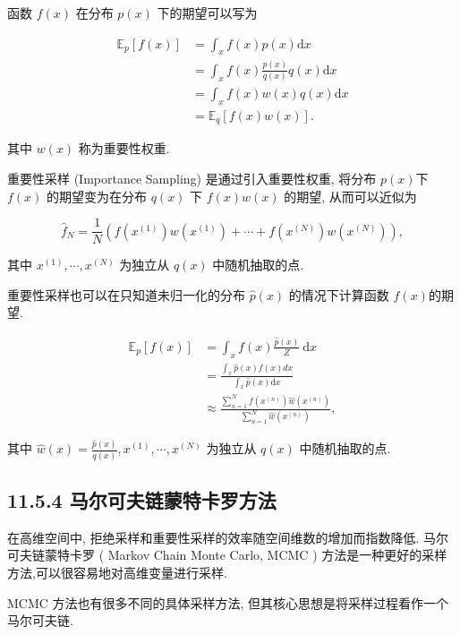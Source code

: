 \documentclass[10pt]{article}
\begin{document}
函数 $f(x)$ 在分布 $p(x)$ 下的期望可以写为


\begin{align*}
\mathbb{E}_{p}[f(x)] & =\int_{x} f(x) p(x) \mathrm{d} x  \tag{11.99}\\
& =\int_{x} f(x) \frac{p(x)}{q(x)} q(x) \mathrm{d} x  \tag{11.100}\\
& =\int_{x} f(x) w(x) q(x) \mathrm{d} x  \tag{11.101}\\
& =\mathbb{E}_{q}[f(x) w(x)] . \tag{11.102}
\end{align*}


其中 $w(x)$ 称为重要性权重.

重要性采样 (Importance Sampling) 是通过引入重要性权重, 将分布 $p(x)$下 $f(x)$ 的期望变为在分布 $q(x)$ 下 $f(x) w(x)$ 的期望, 从而可以近似为


\begin{equation*}
\hat{f}_{N}=\frac{1}{N}\left(f\left(x^{(1)}\right) w\left(x^{(1)}\right)+\cdots+f\left(x^{(N)}\right) w\left(x^{(N)}\right)\right), \tag{11.103}
\end{equation*}


其中 $x^{(1)}, \cdots, x^{(N)}$ 为独立从 $q(x)$ 中随机抽取的点.

重要性采样也可以在只知道未归一化的分布 $\hat{p}(x)$ 的情况下计算函数 $f(x)$的期望.


\begin{align*}
\mathbb{E}_{p}[f(x)] & =\int_{x} f(x) \frac{\hat{p}(x)}{Z} \mathrm{~d} x  \tag{11.104}\\
& =\frac{\int_{x} \hat{p}(x) f(x) d x}{\int_{x} \hat{p}(x) \mathrm{d} x}  \tag{11.105}\\
& \approx \frac{\sum_{n=1}^{N} f\left(x^{(n)}\right) \hat{w}\left(x^{(n)}\right)}{\sum_{n=1}^{N} \hat{w}\left(x^{(n)}\right)}, \tag{11.106}
\end{align*}


其中 $\hat{w}(x)=\frac{\hat{p}(x)}{q(x)}, x^{(1)}, \cdots, x^{(N)}$ 为独立从 $q(x)$ 中随机抽取的点.

\subsection*{11.5.4 马尔可夫链蒙特卡罗方法}
在高维空间中, 拒绝采样和重要性采样的效率随空间维数的增加而指数降低. 马尔可夫链蒙特卡罗 ( Markov Chain Monte Carlo, MCMC ) 方法是一种更好的采样方法,可以很容易地对高维变量进行采样.

MCMC 方法也有很多不同的具体采样方法, 但其核心思想是将采样过程看作一个马尔可夫链.
\end{document}
